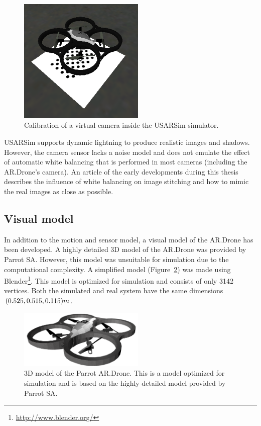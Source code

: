 \begin{figure}[htb!]
\centering
\includegraphics[width=6cm]{images/usarsim_camera_calibration.png}
\caption{Calibration of a virtual camera inside the USARSim simulator.} 
\label{fig:3Dmodel}
\end{figure}

USARSim supports dynamic lightning to produce realistic images and shadows.
However, the camera sensor lacks a noise model and does not emulate the effect of automatic white balancing that is performed in most cameras (including the AR.Drone's camera).
An article of the early developments during this thesis \cite{Visser2011imav} describes the influence of white balancing on image stitching and how to mimic the real images as close as possible.


		\subsection{Visual model}
In addition to the motion and sensor model, a visual model of the AR.Drone has been developed.
A highly detailed 3D model of the AR.Drone was provided by Parrot SA.
However, this model was unsuitable for simulation due to the computational complexity.
A simplified model (Figure~\ref{fig:3Dmodel}) was made using Blender\footnote{\url{http://www.blender.org/}}.
This model is optimized for simulation and consists of only 3142 vertices.
Both the simulated and real system have the same dimensions $(0.525,0.515,0.115)\small{m}$.

\begin{figure}[htb!]
\centering
\includegraphics[width=6cm]{images/ardrone_blender_final.png}
\caption{3D model of the Parrot AR.Drone. This is a model optimized for simulation and is based on the highly detailed model provided by Parrot SA.} 
\label{fig:3Dmodel}
\end{figure}


